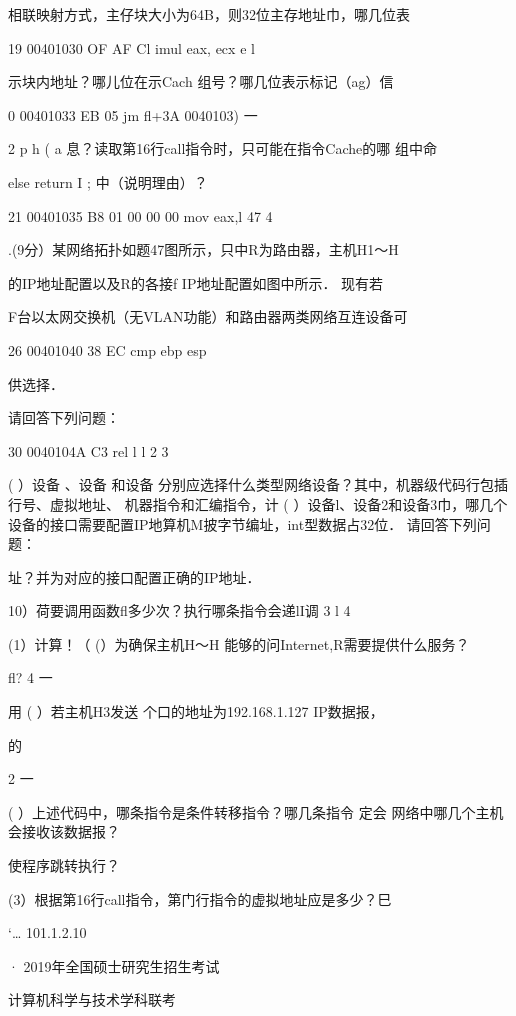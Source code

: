 {{    相联映射方式，主仔块大小为64B，则32位主存地址巾，哪几位表

    19 00401030    OF AF Cl     imul  eax, ecx    e    l

    示块内地址？哪儿位在示Cach 组号？哪几位表示标记（ag）信

    0 00401033    EB 05     jm   fl+3A   0040103)    一

    2    p     h (    a    息？读取第16行call指令时，只可能在指令Cache的哪  组中命

    else return I ;    中（说明理由）？

    21 00401035    B8 01 00 00 00 mov  eax,l     47    4

    .(9分）某网络拓扑如题47图所示，只中R为路由器，主机H1～H

    的IP地址配置以及R的各接f IP地址配置如图中所示． 现有若

    F台以太网交换机（无VLAN功能）和路由器两类网络互连设备可

    26 00401040     38 EC     cmp   ebp esp

    供选择．

    请回答下列问题：

    30 0040104A    C3     rel     l     l    2    3

    ( ）设备 、设备  和设备  分别应选择什么类型网络设备？其中，机器级代码行包插行号、虚拟地址、 机器指令和汇编指令，计    ( ）设备l、设备2和设备3巾，哪几个设备的接口需要配置IP地算机M披字节编址，int型数据占32位． 请回答下列问题：

    址？并为对应的接口配置正确的IP地址．

    10）荷要调用函数fl多少次？执行哪条指令会递lI调    3    l   4

(1）计算！（    (）为确保主机H～H 能够的问Internet,R需要提供什么服务？

    fl?    4    一

    用    ( ）若主机H3发送  个口的地址为192.168.1.127   IP数据报，

    的

 2    一

( ）上述代码中，哪条指令是条件转移指令？哪几条指令  定会    网络中哪几个主机会接收该数据报？

    使程序跳转执行？

(3）根据第16行call指令，第门行指令的虚拟地址应是多少？巳

    ‘…    101.1.2.10

    ·    2019年全国硕士研究生招生考试

    计算机科学与技术学科联考

}}

